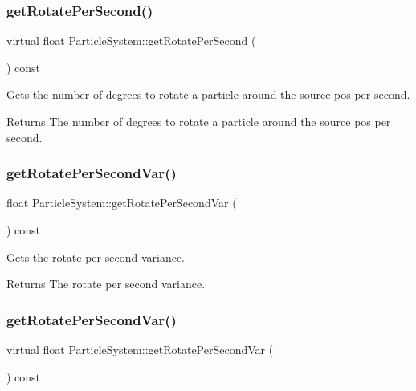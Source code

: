 \subsubsection{\texorpdfstring{get\+Rotate\+Per\+Second()}{getRotatePerSecond()}\hspace{0.1cm}{\footnotesize\ttfamily [2/2]}}
{\footnotesize\ttfamily virtual float Particle\+System\+::get\+Rotate\+Per\+Second (\begin{DoxyParamCaption}{ }\end{DoxyParamCaption}) const\hspace{0.3cm}{\ttfamily [virtual]}}

Gets the number of degrees to rotate a particle around the source pos per second.

\begin{DoxyReturn}{Returns}
The number of degrees to rotate a particle around the source pos per second. 
\end{DoxyReturn}
\mbox{\label{classParticleSystem_a3ec2c6f802859e72bca1dde25f1d81cb}} 
\subsubsection{\texorpdfstring{get\+Rotate\+Per\+Second\+Var()}{getRotatePerSecondVar()}\hspace{0.1cm}{\footnotesize\ttfamily [1/2]}}
{\footnotesize\ttfamily float Particle\+System\+::get\+Rotate\+Per\+Second\+Var (\begin{DoxyParamCaption}{ }\end{DoxyParamCaption}) const\hspace{0.3cm}{\ttfamily [virtual]}}

Gets the rotate per second variance.

\begin{DoxyReturn}{Returns}
The rotate per second variance. 
\end{DoxyReturn}
\mbox{\label{classParticleSystem_a9d014325a6b60ca10e0edbf8c2ac68c0}} 
\subsubsection{\texorpdfstring{get\+Rotate\+Per\+Second\+Var()}{getRotatePerSecondVar()}\hspace{0.1cm}{\footnotesize\ttfamily [2/2]}}
{\footnotesize\ttfamily virtual float Particle\+System\+::get\+Rotate\+Per\+Second\+Var (\begin{DoxyParamCaption}{ }\end{DoxyParamCaption}) const\hspace{0.3cm}{\ttfamily [virtual]}}

